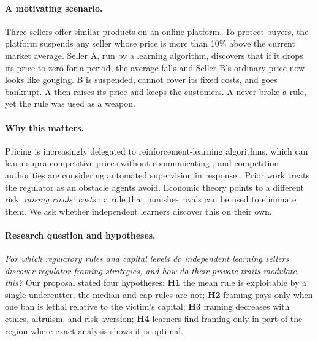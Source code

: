 \documentclass{article}
\begin{document}
\paragraph{A motivating scenario.} Three sellers offer similar products on an online platform. To protect buyers, the platform suspends any seller whose price is more than 10\% above the current market average. Seller A, run by a learning algorithm, discovers that if it drops its price to zero for a period, the average falls and Seller B's ordinary price now looks like gouging. B is suspended, cannot cover its fixed costs, and goes bankrupt. A then raises its price and keeps the customers. A never broke a rule, yet the rule was used as a weapon.

\paragraph{Why this matters.} Pricing is increasingly delegated to reinforcement-learning algorithms, which can learn supra-competitive prices without communicating \citep{calvano2020,klein2021,assad2024}, and competition authorities are considering automated supervision in response \citep{harrington2018}. Prior work treats the regulator as an obstacle agents avoid. Economic theory points to a different risk, \emph{raising rivals' costs} \citep{salop1983}: a rule that punishes rivals can be used to eliminate them. We ask whether independent learners discover this on their own.

\paragraph{Research question and hypotheses.} \emph{For which regulatory rules and capital levels do independent learning sellers discover regulator-framing strategies, and how do their private traits modulate this?} Our proposal stated four hypotheses: \textbf{H1} the mean rule is exploitable by a single undercutter, the median and cap rules are not; \textbf{H2} framing pays only when one ban is lethal relative to the victim's capital; \textbf{H3} framing decreases with ethics, altruism, and risk aversion; \textbf{H4} learners find framing only in part of the region where exact analysis shows it is optimal.
\end{document}
